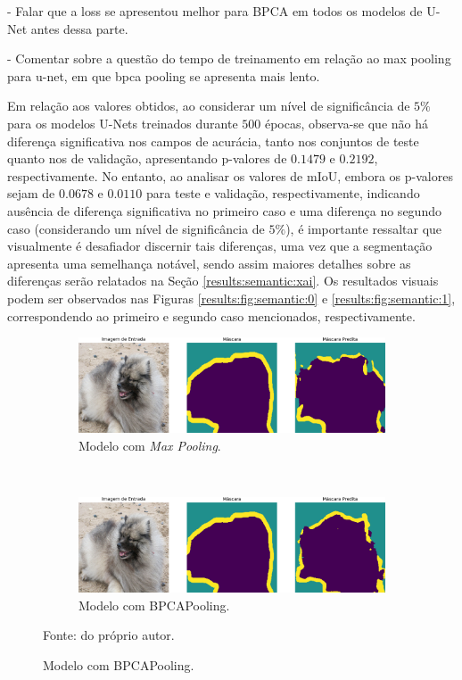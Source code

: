 - Falar que a loss se apresentou melhor para BPCA em todos os modelos de U-Net antes dessa parte.

- Comentar sobre a questão do tempo de treinamento em relação ao max pooling para u-net, em que bpca pooling se apresenta mais lento.

Em relação aos valores obtidos, ao considerar um nível de significância de $5\%$ para os modelos U-Nets treinados durante $500$ épocas, observa-se que não há diferença significativa nos campos de acurácia, tanto nos conjuntos de teste quanto nos de validação, apresentando p-valores de $0.1479$ e $0.2192$, respectivamente. No entanto, ao analisar os valores de mIoU, embora os p-valores sejam de $0.0678$ e $0.0110$ para teste e validação, respectivamente, indicando ausência de diferença significativa no primeiro caso e uma diferença no segundo caso (considerando um nível de significância de $5\%$), é importante ressaltar que visualmente é desafiador discernir tais diferenças, uma vez que a segmentação apresenta uma semelhança notável, sendo assim maiores detalhes sobre as diferenças serão relatados na Seção \ref{results:semantic:xai}. Os resultados visuais podem ser observados nas Figuras \ref{results:fig:semantic:0} e \ref{results:fig:semantic:1}, correspondendo ao primeiro e segundo caso mencionados, respectivamente.

\begin{figure}[H]
    \centering
   \caption{Imagem de entrada, máscara e saída do modelo U-Net baseado em acurácia, respectivamente.}
    \label{results:fig:semantic:0}
    \begin{subfigure}[t]{1\textwidth}
        \centering
        \includegraphics[width=1\linewidth]{recursos/imagens/results/image_0_max_unet_500.png}
        \caption{Modelo com \textit{Max Pooling}.}
        \label{results:fig:semantic:0.1}
    \end{subfigure}%
    ~
    
    \begin{subfigure}[t]{1\textwidth}
        \centering
        \includegraphics[width=1\linewidth]{recursos/imagens/results/image_0_bpca_unet_500.png}
        \caption{Modelo com BPCAPooling.}
        \label{results:fig:semantic:0.2}
    \end{subfigure}%

    Fonte: do próprio autor.
\end{figure}


